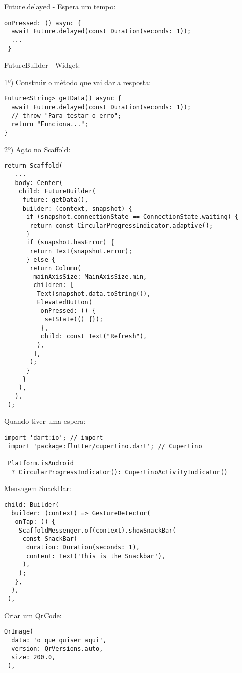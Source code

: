\documentclass[11pt]{scrartcl}
\begin{document}
Future.delayed - Espera um tempo:
\begin{lstlisting}[]
 onPressed: () async {
  await Future.delayed(const Duration(seconds: 1));
  ...
 }
\end{lstlisting}

FutureBuilder - Widget:

1º) Construir o método que vai dar a resposta:
\begin{lstlisting}[]
Future<String> getData() async {
  await Future.delayed(const Duration(seconds: 1));
  // throw "Para testar o erro";
  return "Funciona...";
}
\end{lstlisting}

2º) Ação no Scaffold:
\begin{lstlisting}[]
 return Scaffold(
   ...
   body: Center(
    child: FutureBuilder(
     future: getData(),
     builder: (context, snapshot) {
      if (snapshot.connectionState == ConnectionState.waiting) {
       return const CircularProgressIndicator.adaptive();
      }
      if (snapshot.hasError) {
       return Text(snapshot.error);
      } else {
       return Column(
        mainAxisSize: MainAxisSize.min,
        children: [
         Text(snapshot.data.toString()),
         ElevatedButton(
          onPressed: () {
           setState(() {});
          },
          child: const Text("Refresh"),
         ),
        ],
       );
      }
     }
    ),
   ),
 );
\end{lstlisting}

Quando tiver uma espera:
\begin{lstlisting}[]
 import 'dart:io'; // import
 import 'package:flutter/cupertino.dart'; // Cupertino

 Platform.isAndroid
  ? CircularProgressIndicator(): CupertinoActivityIndicator()
\end{lstlisting}

Mensagem SnackBar:
\begin{lstlisting}[]
 child: Builder(
  builder: (context) => GestureDetector(
   onTap: () {
    ScaffoldMessenger.of(context).showSnackBar(
     const SnackBar(
      duration: Duration(seconds: 1),
      content: Text('This is the Snackbar'),
     ),
    );
   },
  ),
 ),
\end{lstlisting}

Criar um QrCode:
\begin{lstlisting}[]
 QrImage(
  data: 'o que quiser aqui',
  version: QrVersions.auto,
  size: 200.0,
 ),
\end{lstlisting}
\end{document}
